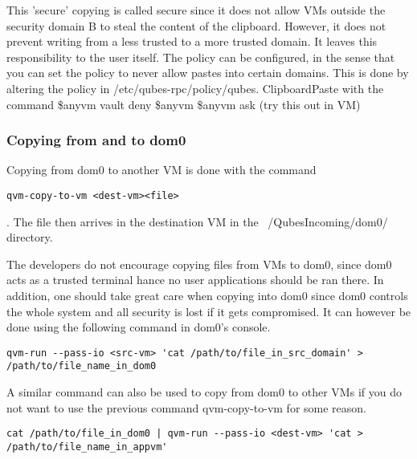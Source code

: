 \documentclass[runningheads,a4paper]{article}
\begin{document}
 This 'secure' copying is called secure since it does not allow VMs
outside the security domain B to steal the content of the clipboard.
However, it does not prevent writing from a less trusted to a more
trusted domain.  It leaves this responsibility to the user itself.
The policy can be configured, in the sense that you can set the policy
to never allow pastes into certain domains.  This is done by altering
the policy in /etc/qubes-rpc/policy/qubes. ClipboardPaste with the
command \$anyvm vault deny \$anyvm \$anyvm ask (try this out in VM)

\subsubsection{Copying from and to dom0} 

Copying from dom0 to another
VM is done with the command
\begin{verbatim}
qvm-copy-to-vm <dest-vm><file>
\end{verbatim}.
The file then arrives in the destination VM in the
~/QubesIncoming/dom0/ directory.

The developers do not encourage copying files from VMs to dom0, since
dom0 acts as a trusted terminal hance no user applications should be
ran there.  In addition, one should take great care when copying into
dom0 since dom0 controls the whole system and all security is lost if
it gets compromised.  It can however be done using the following
command in dom0's console.  
\begin{verbatim}
qvm-run --pass-io <src-vm> 'cat /path/to/file_in_src_domain' > /path/to/file_name_in_dom0 
\end{verbatim} 
 A similar command can also be used to copy from dom0 to other VMs if
you do not want to use the previous command qvm-copy-to-vm for some
reason.  
\begin{verbatim}
cat /path/to/file_in_dom0 | qvm-run --pass-io <dest-vm> 'cat > /path/to/file_name_in_appvm'
\end{verbatim}
\end{document}
